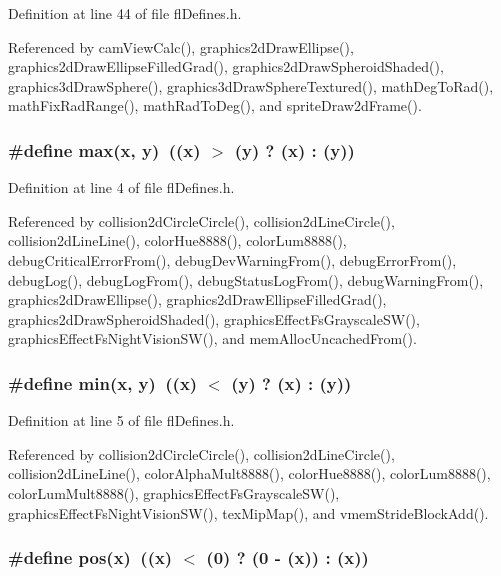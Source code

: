 Definition at line 44 of file fl\-Defines.h.

Referenced by cam\-View\-Calc(), graphics2d\-Draw\-Ellipse(), graphics2d\-Draw\-Ellipse\-Filled\-Grad(), graphics2d\-Draw\-Spheroid\-Shaded(), graphics3d\-Draw\-Sphere(), graphics3d\-Draw\-Sphere\-Textured(), math\-Deg\-To\-Rad(), math\-Fix\-Rad\-Range(), math\-Rad\-To\-Deg(), and sprite\-Draw2d\-Frame().
\subsubsection{\setlength{\rightskip}{0pt plus 5cm}\#define max(x, y)~((x) $>$ (y) ? (x) : (y))}\label{flDefines_8h_c39d9cef6a5e030ba8d9e11121054268}




Definition at line 4 of file fl\-Defines.h.

Referenced by collision2d\-Circle\-Circle(), collision2d\-Line\-Circle(), collision2d\-Line\-Line(), color\-Hue8888(), color\-Lum8888(), debug\-Critical\-Error\-From(), debug\-Dev\-Warning\-From(), debug\-Error\-From(), debug\-Log(), debug\-Log\-From(), debug\-Status\-Log\-From(), debug\-Warning\-From(), graphics2d\-Draw\-Ellipse(), graphics2d\-Draw\-Ellipse\-Filled\-Grad(), graphics2d\-Draw\-Spheroid\-Shaded(), graphics\-Effect\-Fs\-Grayscale\-SW(), graphics\-Effect\-Fs\-Night\-Vision\-SW(), and mem\-Alloc\-Uncached\-From().
\subsubsection{\setlength{\rightskip}{0pt plus 5cm}\#define min(x, y)~((x) $<$ (y) ? (x) : (y))}\label{flDefines_8h_bb702d8b501669a23aa0ab3b281b9384}




Definition at line 5 of file fl\-Defines.h.

Referenced by collision2d\-Circle\-Circle(), collision2d\-Line\-Circle(), collision2d\-Line\-Line(), color\-Alpha\-Mult8888(), color\-Hue8888(), color\-Lum8888(), color\-Lum\-Mult8888(), graphics\-Effect\-Fs\-Grayscale\-SW(), graphics\-Effect\-Fs\-Night\-Vision\-SW(), tex\-Mip\-Map(), and vmem\-Stride\-Block\-Add().
\subsubsection{\setlength{\rightskip}{0pt plus 5cm}\#define pos(x)~((x) $<$ (0) ? (0 - (x)) : (x))}\label{flDefines_8h_42f121ae9f519a25bd4d2697456e2e8f}




